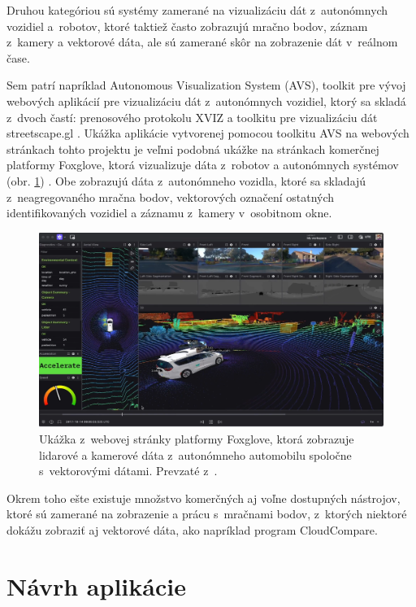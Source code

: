 Druhou kategóriou sú systémy zamerané na vizualizáciu dát z~autonómnych vozidiel a~robotov, ktoré taktiež často zobrazujú mračno bodov, záznam z~kamery a vektorové dáta, ale sú zamerané skôr na zobrazenie dát v~reálnom čase. 

Sem patrí napríklad Autonomous Visualization System (AVS), toolkit pre vývoj webových aplikácií pre vizualizáciu dát z~autonómnych vozidiel, ktorý sa skladá z~dvoch častí: prenosového protokolu XVIZ a toolkitu pre vizualizáciu dát streetscape.gl \cite{avs}. Ukážka aplikácie vytvorenej pomocou toolkitu AVS na webových stránkach tohto projektu je veľmi podobná ukážke na stránkach komerčnej platformy Foxglove, ktorá vizualizuje dáta z~robotov a autonómnych systémov (obr. \ref{fig:foxglove}) \cite{foxglove}. Obe zobrazujú dáta z~autonómneho vozidla, ktoré sa skladajú z~neagregovaného mračna bodov, vektorových označení ostatných identifikovaných vozidiel a záznamu z~kamery v~osobitnom okne.

\begin{figure}[h]
    \centering
    \includegraphics[width=1\linewidth]{text_prace/obrazky-figures/Foxglove.png}
    \caption[Ukážka z~webovej stránky platformy Foxglove.]{Ukážka z~webovej stránky platformy Foxglove, ktorá zobrazuje lidarové a kamerové dáta z~autonómneho automobilu spoločne s~vektorovými dátami. Prevzaté z~\cite{foxglove}.}
    \label{fig:foxglove}
\end{figure}

Okrem toho ešte existuje množstvo komerčných aj voľne dostupných nástrojov, ktoré sú zamerané na zobrazenie a prácu s~mračnami bodov, z~ktorých niektoré dokážu zobraziť aj vektorové dáta, ako napríklad program CloudCompare.

\chapter{Návrh aplikácie}
\label{ch:navrh}

